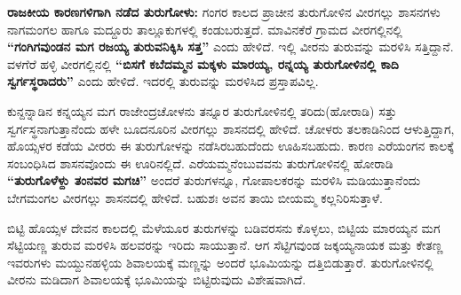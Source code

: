 \vskip -2pt

\textbf{ರಾಜಕೀಯ ಕಾರಣಗಳಿಗಾಗಿ ನಡೆದ ತುರುಗೋಳು: } ಗಂಗರ ಕಾಲದ ಪ್ರಾಚೀನ ತುರುಗೋಳಿನ ವೀರಗಲ್ಲು ಶಾಸನಗಳು ನಾಗಮಂಗಲ ಹಾಗೂ ಮದ್ದೂರು ತಾಲ್ಲೂಕುಗಳಲ್ಲಿ ಕಂಡುಬರುತ್ತದೆ. ಮಾವಿನಕೆರೆ ಗ್ರಾಮದ ವೀರಗಲ್ಲಿನಲ್ಲಿ \textbf{“ಗಂಗಿಗವುಂಡನ ಮಗ ರಜಯ್ಯ ತುರುವನಿಕ್ಕಿಸಿ ಸತ್ತ”} ಎಂದು ಹೇಳಿದೆ. ಇಲ್ಲಿ ವೀರನು ತುರುವನ್ನು ಮರಳಿಸಿ ಸತ್ತಿದ್ದಾನೆ. ವಳಗೆರೆ ಹಳ್ಳಿ ವೀರಗಲ್ಲಿನಲ್ಲಿ \textbf{“ಬಿಸಗೆ ಕಬೆದಮ್ಮನ ಮಕ್ಕಳು ಮಾರಯ್ಯ, ರನ್ನಯ್ಯ ತುರುಗೋಳಿನಲ್ಲಿ ಕಾದಿ ಸ್ವರ್ಗಸ್ಥರಾದರು”} ಎಂದು ಹೇಳಿದೆ. ಇದರಲ್ಲಿ ತುರುವನ್ನು ಮರಳಿಸಿದ ಪ್ರಸ್ತಾಪವಿಲ್ಲ.

\vfill\eject

ಕುನ್ದನ್ನಾಡಿನ ಕನ್ನಯ್ಯನ ಮಗ ರಾಜೇಂದ್ರಚೋಳನು ತನ್ನೂರ ತುರುಗೋಳಿನಲ್ಲಿ ತರಿದು(ಹೋರಾಡಿ) ಸತ್ತು ಸ್ವರ್ಗಸ್ಥನಾಗುತ್ತಾನೆಂದು ಹಳೇ ಬೂದನೂರಿನ ವೀರಗಲ್ಲು ಶಾಸನದಲ್ಲಿ ಹೇಳಿದೆ. ಚೋಳರು ತಲಕಾಡಿನಿಂದ ಆಳುತ್ತಿದ್ದಾಗ, ಹೊಯ್ಸಳರ ಕಡೆಯ ವೀರರು ಈ ತುರುಗೋಳನ್ನು ನಡೆಸಿರಬಹುದೆಂದು ಊಹಿಸಬಹುದು. ಕಾರಣ ಎರೆಯಂಗನ ಕಾಲಕ್ಕೆ ಸಂಬಂಧಿಸಿದ ಶಾಸನವೊಂದು ಈ ಊರಿನಲ್ಲಿದೆ. ಎರೆಯಮ್ಮನೆಂಬುವವನು ತುರುಗೋಳಿನಲ್ಲಿ ಹೋರಾಡಿ \textbf{“ತುರುಗೊಳೆಳ್ದು ತಂನವರ ಮಗಚಿ”} ಅಂದರೆ ತುರುಗಳನ್ನೂ, ಗೋಪಾಲಕರನ್ನು ಮರಳಿಸಿ ಮಡಿಯುತ್ತಾನೆಂದು ಬೇಗಮಂಗಲ ವೀರಗಲ್ಲು ಶಾಸನದಲ್ಲಿ ಹೇಳಿದೆ. ಬಹುಶಃ ಅವನ ತಾಯಿ ಬೀಯಮ್ಮ ಕಲ್ಲನಿರಿಸುತ್ತಾಳೆ.

ಬಿಟ್ಟಿ ಹೊಯ್ಸಳ ದೇವನ ಕಾಲದಲ್ಲಿ ಮೆಳೆಯೂರ ತುರುಗಳನ್ನು ಬಡಿವರಸನು ಕೊಳ್ಳಲು, ಬಿಟ್ಟಿಯ ಮಾರಯ್ಯನ ಮಗ ಸೆಟ್ಟಿಯಣ್ಣ ತುರುವ ಮರಳಿಸಿ ಹಲವರನ್ನು ಇರಿದು ಸಾಯುತ್ತಾನೆ. ಆಗ ಸೆಟ್ಟಿಗವುಂಡ ಜಕ್ಕಯ್ಯನಾಯಕ ಮತ್ತು ಕೇತಣ್ಣ ಇವರುಗಳು ಮಯ್ದುನಹಳ್ಳಿಯ ಶಿವಾಲಯಕ್ಕೆ ಮಣ್ಣನ್ನು ಅಂದರೆ ಭೂಮಿಯನ್ನು ದತ್ತಿಬಿಡುತ್ತಾರೆ. ತುರುಗೋಳಿನಲ್ಲಿ ವೀರನು ಮಡಿದಾಗ ಶಿವಾಲಯಕ್ಕೆ ಭೂಮಿಯನ್ನು ಬಿಟ್ಟಿರುವುದು ವಿಶೇಷವಾಗಿದೆ.

